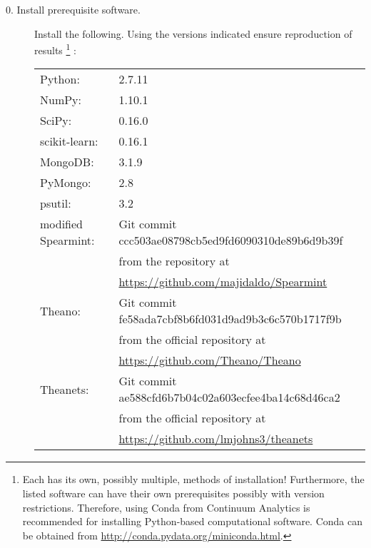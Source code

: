 \begin{description}

\item[0. Install prerequisite software.] \hfill

  Install the following.
  Using the versions indicated ensure reproduction of results
  \footnote{
    Each has its own, possibly multiple, methods of installation!
    Furthermore, the listed software can have their own prerequisites possibly with version restrictions.
    Therefore, using \textsf{Conda} from Continuum Analytics is recommended for installing \textsf{Python}-based computational software.
    Conda can be obtained from \url{http://conda.pydata.org/miniconda.html}.
  }%
  :
  
  \begin{tabular}{ll}
    \textsf{Python}:              & 2.7.11 \\
    \textsf{NumPy}:               & 1.10.1 \\
    \textsf{SciPy}:               & 0.16.0 \\
    \textsf{scikit-learn}:        & 0.16.1 \\
    \textsf{MongoDB}:             & 3.1.9 \\
    \textsf{PyMongo}:             & 2.8 \\
    \textsf{psutil}:              & 3.2 \\
    modified \textsf{Spearmint}:  & \textsf{Git} commit ccc503ae08798cb5ed9fd6090310de89b6d9b39f \\
                                  & from the repository at \\ 
                                  & \url{https://github.com/majidaldo/Spearmint} \\
    \textsf{Theano}:              & \textsf{Git} commit fe58ada7cbf8b6fd031d9ad9b3c6c570b1717f9b \\
                                  & from the official repository at \\
                                  & \url{https://github.com/Theano/Theano} \\
    \textsf{Theanets}:            & \textsf{Git} commit ae588cfd6b7b04c02a603ecfee4ba14c68d46ca2 \\
                                  & from the official repository at \\ 
                                  & \url{https://github.com/lmjohns3/theanets}
  \end{tabular}




\end{description}
